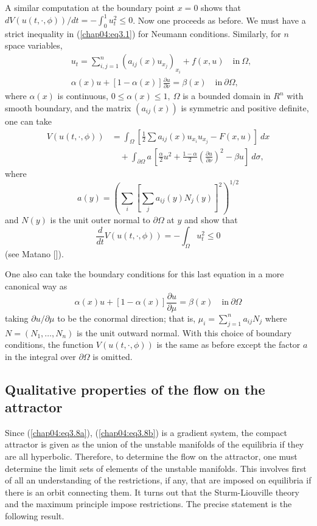 \documentclass{surv-l}
\theoremstyle{plain}
\theoremstyle{definition}
\numberwithin{equation}{section}
\numberwithin{figure}{chapter}
\begin{document}
A similar computation at the boundary point $x =0$ shows that $dV(u(t, \cdot, \phi))/dt =-\int_{0}^{1}u_{t}^{2}\leq 0$. Now one proceeds as before. We must have a strict inequality in (\ref{chap04:eq3.1}) for Neumann conditions. Similarly, for $n$ space variables,
\begin{align*}
&u_{t}=\sum_{i,j=1}^{n}(a_{ij}(x)u_{x_{j}})_{x_{i}}+f(x, u)\quad \mathrm{in}\ \Omega,\\
&\alpha(x)u+[1-\alpha(x)]\frac{\partial u}{\partial\nu}=\beta(x)\quad \mathrm{in}\ \partial\Omega,
\end{align*}
where $\alpha(x)$ is continuous, $0\leq\alpha(x)\leq 1,\ \Omega$ is a bounded domain in $R^{n}$ with smooth boundary, and the matrix $(a_{ij}(x))$ is symmetric and positive definite, one can take
\begin{align*}
V(u(t, \cdot, \phi))&=\int_{\Omega}\left[\frac{1}{2}\sum a_{ij}(x)u_{x_{i}}u_{x_{j}}-F(x, u)\right]\ dx\\
&\quad+\int_{\partial\Omega}a\,\left[\frac{\alpha}{2}u^{2}+\frac{1-\alpha}{2}\left(\frac{\partial u}{\partial\nu}\right)^{2}-\beta u\right]\ d\sigma,
\end{align*}
where
\begin{equation*}
a(y)=\left(\sum_{i}\left[\sum_{j}a_{ij}(y)N_{j}(y)\right]^{2}\right)^{1/2}
\end{equation*}
and $N(y)$ is the unit outer normal to $\partial\Omega$ at $y$ and show that
\begin{equation*}
\frac{d}{dt}V(u(t, \cdot, \phi))=-\int_{\Omega}u_{t}^{2}\leq 0
\end{equation*}
(see Matano [\citeyear{1979m}]).

One also can take the boundary conditions for this last equation in a more canonical way as
\begin{equation*}
\alpha(x)u+[1-\alpha(x)]\frac{\partial u}{\partial\mu}=\beta(x)\quad \mathrm{in}\ \partial\Omega
\end{equation*}
taking $\partial u/\partial\mu$ to be the conormal direction; that is,
$\mu_{i}=\sum_{j=1}^{n}a_{ij}N_{j}$ where $N= (N_{1}, \ldots, N_{n})$ is the unit outward normal. With this choice of boundary conditions, the function $V(u(t, \cdot, \phi))$ is the same as before except the factor $a$ in the integral over $\partial\Omega$ is omitted.

\subsection{Qualitative properties of the flow on the attractor}\label{subsec4.3.2} Since (\ref{chap04:eq3.8a}), (\ref{chap04:eq3.8b}) is a gradient system, the compact attractor is given as the union of the unstable manifolds of the equilibria if they are all hyperbolic. Therefore, to determine the flow on the attractor, one must determine the limit sets of elements of the unstable manifolds. This involves first of all an understanding of the restrictions, if any, that are imposed on equilibria if there is an orbit connecting them. It turns out that the Sturm-Liouville theory and the maximum principle impose restrictions. The precise statement is the following result.
\end{document}
